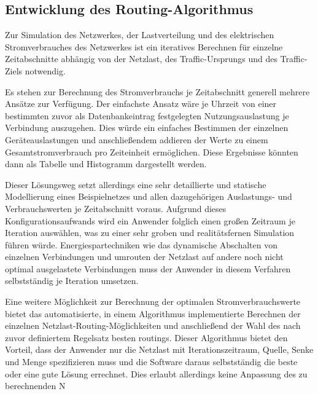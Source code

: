 \documentclass[12pt,titlepage]{article}
\begin{document}
\subsection{Entwicklung des Routing-Algorithmus}\label{subsec:MethAlg}
Zur Simulation des Netzwerkes, der Lastverteilung und des elektrischen Stromverbrauches des Netzwerkes ist ein iteratives Berechnen für einzelne Zeitabschnitte abhängig von der Netzlast, des Traffic-Ursprungs und des Traffic-Ziels notwendig.

Es stehen zur Berechnung des Stromverbrauchs je Zeitabschnitt generell mehrere Ansätze zur Verfügung. Der einfachste Ansatz wäre je Uhrzeit von einer bestimmten zuvor als Datenbankeintrag festgelegten Nutzungsauslastung je Verbindung auszugehen. Dies würde ein einfaches Bestimmen der einzelnen Geräteauslastungen und anschließendem addieren der Werte zu einem Gesamtstromverbrauch pro Zeiteinheit ermöglichen. Diese Ergebnisse könnten dann als Tabelle und Histogramm dargestellt werden.

Dieser Lösungsweg setzt allerdings eine sehr detaillierte und statische Modellierung eines Beispielnetzes und allen dazugehörigen Auslastungs- und Verbrauchswerten je Zeitabschnitt voraus. Aufgrund dieses Konfigurationsaufwands wird ein Anwender folglich einen großen Zeitraum je Iteration auswählen, was zu einer sehr groben und realitätsfernen Simulation führen würde. Energiespartechniken wie das dynamische Abschalten von einzelnen Verbindungen und umrouten der Netzlast auf andere noch nicht optimal ausgelastete Verbindungen muss der Anwender in diesem Verfahren selbstständig je Iteration umsetzen.

Eine weitere Möglichkeit zur Berechnung der optimalen Stromverbrauchswerte bietet das automatisierte, in einem Algorithmus implementierte Berechnen der einzelnen Netzlast-Routing-Möglichkeiten und anschließend der Wahl des nach zuvor definiertem Regelsatz besten routings. Dieser Algorithmus bietet den Vorteil, dass der Anwender nur die Netzlast mit Iterationszeitraum, Quelle, Senke und Menge spezifizieren muss und die Software daraus selbstständig die beste oder eine gute Lösung errechnet.
Dies erlaubt allerdings keine Anpassung des zu berechnenden N
\end{document}
